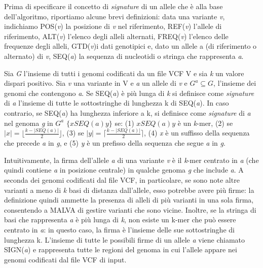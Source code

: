 \documentclass[../main.tex]{subfiles}
\begin{document}
Prima di specificare il concetto di \textit{signature} di un allele che è alla base dell'algoritmo, riportiamo alcune brevi definizioni: data una variante \textit{v}, indichiamo POS(\textit{v}) la posizione di \textit{v} nel riferimento, REF(\textit{v}) l'allele di riferimento, ALT(\textit{v}) l'elenco degli alleli alternati, FREQ(\textit{v}) l'elenco delle frequenze degli alleli, GTD(\textit{v})i dati genotipici e, dato un allele a (di riferimento o alternato) di \textit{v}, SEQ(\textit{a}) la sequenza di nucleotidi o stringa che rappresenta \textit{a}.

\theoremstyle{definition}
\begin{definition} 

Sia \textit{G} l'insieme di tutti i genomi codificati da un file VCF V e sia \textit{k} un valore dispari positivo. Sia \textit{v} una variante in V e \textit{a} un allele di \textit{v} e $\textit{G}^{a} \subseteq \textit{G}$, l'insieme dei genomi che contengono \textit{a}. Se SEQ(\textit{a}) è più lunga di \textit{k} si definisce come \textit{signature} di \textit{a} l'insieme di tutte le sottostringhe di lunghezza k di SEQ(\textit{a}). In caso contrario, se SEQ(\textit{a}) ha lunghezza inferiore a k, si definisce come \textit{signature} di \textit{a} nel genoma \textit{g} in $\textit{G}^{a}$ $\{ \textit{x}SEQ(\textit{a})\textit{y} \} $ se: (1) $\textit{x}SEQ(\textit{a})\textit{y}$ è un \textit{k}-mer, (2) se $|\textit{x}| = \lfloor \frac{k-|SEQ(\textit{a})|}{2} \rfloor$, (3) se $|\textit{y}| = \lceil \frac{k-|SEQ(\textit{a})|}{2} \rceil$, (4) \textit{x} è un suffisso della sequenza che precede \textit{a} in \textit{g}, e (5) \textit{y} è un prefisso della sequenza che segue \textit{a} in \textit{g}.

\end{definition}

Intuitivamente, la firma dell'allele \textit{a} di una variante \textit{v} è il \textit{k}-mer centrato in \textit{a} (che quindi contiene \textit{a} in posizione centrale) in qualche genoma \textit{g} che include \textit{a}. A seconda dei genomi codificati dal file VCF, in particolare, se sono note altre varianti a meno di \textit{k} basi di distanza dall'allele, esso potrebbe avere più firme: la definizione quindi ammette la presenza di alleli di più varianti in una sola firma, consentendo a MALVA di gestire varianti che sono vicine. Inoltre, se la stringa di basi che rappresenta \textit{a} è più lunga di \textit{k}, non esiste un k-mer che può essere centrato in \textit{a}: in questo caso, la firma è l'insieme delle sue sottostringhe di lunghezza k. L'insieme di tutte le possibili firme di un allele \textit{a} viene chiamato SIGN(\textit{a}) e rappresenta tutte le regioni del genoma in cui l'allele appare nei genomi codificati dal file VCF di input.
\end{document}
